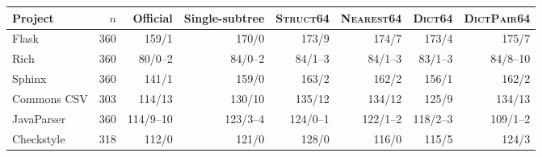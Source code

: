 \begin{tabular}{lrrrrrrr}
\toprule
Project & $n$ & Official & Single-subtree & \textsc{Struct64} & \textsc{Nearest64} & \textsc{Dict64} & \textsc{DictPair64} \\
\midrule
Flask & 360 & 159/1 & 170/0 & 173/9 & 174/7 & 173/4 & 175/7 \\
Rich & 360 & 80/0--2 & 84/0--2 & 84/1--3 & 84/1--3 & 83/1--3 & 84/8--10 \\
Sphinx & 360 & 141/1 & 159/0 & 163/2 & 162/2 & 156/1 & 162/2 \\
Commons CSV & 303 & 114/13 & 130/10 & 135/12 & 134/12 & 125/9 & 134/13 \\
JavaParser & 360 & 114/9--10 & 123/3--4 & 124/0--1 & 122/1--2 & 118/2--3 & 109/1--2 \\
Checkstyle & 318 & 112/0 & 121/0 & 128/0 & 116/0 & 115/5 & 124/3 \\
\bottomrule
\end{tabular}
